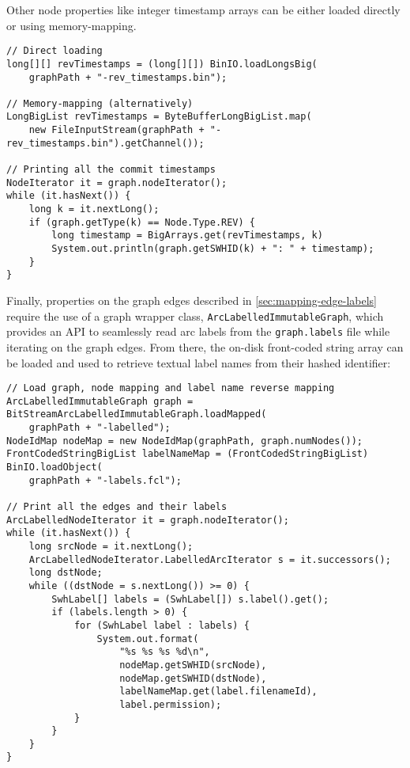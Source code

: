 Other node properties like integer timestamp arrays can be either loaded
directly or using memory-mapping.

\begin{verbatim}
// Direct loading
long[][] revTimestamps = (long[][]) BinIO.loadLongsBig(
    graphPath + "-rev_timestamps.bin");

// Memory-mapping (alternatively)
LongBigList revTimestamps = ByteBufferLongBigList.map(
    new FileInputStream(graphPath + "-rev_timestamps.bin").getChannel());

// Printing all the commit timestamps
NodeIterator it = graph.nodeIterator();
while (it.hasNext()) {
    long k = it.nextLong();
    if (graph.getType(k) == Node.Type.REV) {
        long timestamp = BigArrays.get(revTimestamps, k)
        System.out.println(graph.getSWHID(k) + ": " + timestamp);
    }
}
\end{verbatim}

Finally, properties on the graph edges described in
\cref{sec:mapping-edge-labels} require the use of a graph wrapper class,
\texttt{ArcLabelledImmutableGraph}, which provides an API to seamlessly read
arc labels from the \texttt{graph.labels} file while iterating on the graph
edges. From there, the on-disk front-coded string array can be loaded and used
to retrieve textual label names from their hashed identifier:

\begin{verbatim}
// Load graph, node mapping and label name reverse mapping
ArcLabelledImmutableGraph graph = BitStreamArcLabelledImmutableGraph.loadMapped(
    graphPath + "-labelled");
NodeIdMap nodeMap = new NodeIdMap(graphPath, graph.numNodes());
FrontCodedStringBigList labelNameMap = (FrontCodedStringBigList) BinIO.loadObject(
    graphPath + "-labels.fcl");

// Print all the edges and their labels
ArcLabelledNodeIterator it = graph.nodeIterator();
while (it.hasNext()) {
    long srcNode = it.nextLong();
    ArcLabelledNodeIterator.LabelledArcIterator s = it.successors();
    long dstNode;
    while ((dstNode = s.nextLong()) >= 0) {
        SwhLabel[] labels = (SwhLabel[]) s.label().get();
        if (labels.length > 0) {
            for (SwhLabel label : labels) {
                System.out.format(
                    "%s %s %s %d\n",
                    nodeMap.getSWHID(srcNode),
                    nodeMap.getSWHID(dstNode),
                    labelNameMap.get(label.filenameId),
                    label.permission);
            }
        }
    }
}
\end{verbatim}
